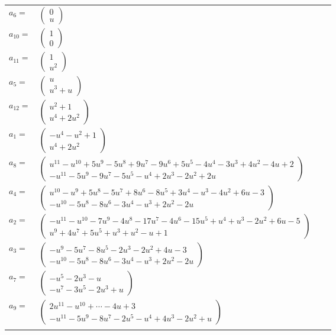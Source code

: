 \documentclass[1p]{elsarticle_modified}
\theoremstyle{definition}
\begin{document}
\begin{tabular}{m{7pt} m{180pt} m{7pt} m{180pt} }
\flushright $a_{6}=$&$\begin{pmatrix}0\\u\end{pmatrix}$ \\
\flushright $a_{10}=$&$\begin{pmatrix}1\\0\end{pmatrix}$ \\
\flushright $a_{11}=$&$\begin{pmatrix}1\\u^2\end{pmatrix}$ \\
\flushright $a_{5}=$&$\begin{pmatrix}u\\u^3+u\end{pmatrix}$ \\
\flushright $a_{12}=$&$\begin{pmatrix}u^2+1\\u^4+2 u^2\end{pmatrix}$ \\
\flushright $a_{1}=$&$\begin{pmatrix}- u^4- u^2+1\\u^4+2 u^2\end{pmatrix}$ \\
\flushright $a_{8}=$&$\begin{pmatrix}u^{11}- u^{10}+5 u^9-5 u^8+9 u^7-9 u^6+5 u^5-4 u^4-3 u^3+4 u^2-4 u+2\\- u^{11}-5 u^9-9 u^7-5 u^5- u^4+2 u^3-2 u^2+2 u\end{pmatrix}$ \\
\flushright $a_{4}=$&$\begin{pmatrix}u^{10}- u^9+5 u^8-5 u^7+8 u^6-8 u^5+3 u^4- u^3-4 u^2+6 u-3\\- u^{10}-5 u^8-8 u^6-3 u^4- u^3+2 u^2-2 u\end{pmatrix}$ \\
\flushright $a_{2}=$&$\begin{pmatrix}- u^{11}- u^{10}-7 u^9-4 u^8-17 u^7-4 u^6-15 u^5+u^4+u^3-2 u^2+6 u-5\\u^9+4 u^7+5 u^5+u^3+u^2- u+1\end{pmatrix}$ \\
\flushright $a_{3}=$&$\begin{pmatrix}- u^9-5 u^7-8 u^5-2 u^3-2 u^2+4 u-3\\- u^{10}-5 u^8-8 u^6-3 u^4- u^3+2 u^2-2 u\end{pmatrix}$ \\
\flushright $a_{7}=$&$\begin{pmatrix}- u^5-2 u^3- u\\- u^7-3 u^5-2 u^3+u\end{pmatrix}$ \\
\flushright $a_{9}=$&$\begin{pmatrix}2 u^{11}- u^{10}+\cdots-4 u+3\\- u^{11}-5 u^9-8 u^7-2 u^5- u^4+4 u^3-2 u^2+u\end{pmatrix}$\\&\end{tabular}
\end{document}
